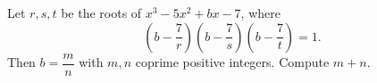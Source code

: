 Let $r,s,t$ be the roots of $x^3-5x^2+bx-7$, where
\[\left(b-\dfrac7r\right)\left(b-\dfrac7s\right)\left(b-\dfrac7t\right)=1.\]
Then $b=\dfrac mn$ with $m,n$ coprime positive integers. Compute $m+n$.
